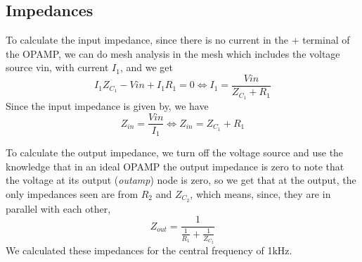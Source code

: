 \subsection{Impedances}
To calculate the input impedance, since there is no current in the + terminal of the OPAMP, we can do mesh analysis in the mesh which includes the voltage source vin, with current $I_1$, and we get
\begin{equation}
  I_1 Z_{C_1}-Vin+I_1 R_1=0 \Leftrightarrow I_1=\frac{Vin}{Z_{C_1}+R_1}
\end{equation}
Since the input impedance is given by, we have
\begin{equation}
  Z_{in}=\frac{Vin}{I_1}\Leftrightarrow Z_{in}=Z_{C_1}+R_1
\end{equation}

To calculate the output impedance, we turn off the voltage source and use the knowledge that in an ideal OPAMP the output impedance is zero to note that the voltage at its output (\textit{outamp}) node is zero, so we get that at the output, the only impedances seen are from $R_2$ and $Z_{C_2}$, which means, since, they are in parallel with each other,
\begin{equation}
  Z_{out}=\frac{1}{\frac{1}{R_1}+\frac{1}{Z_{C_2}}}
\end{equation}
We calculated these impedances for the central frequency of 1kHz.
